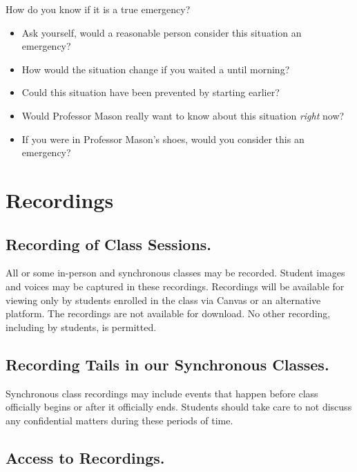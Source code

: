 \documentclass[
]{book}
\providecommand{\tightlist}{%
  \setlength{\itemsep}{0pt}\setlength{\parskip}{0pt}}
\begin{document}
How do you know if it is a true emergency?

\begin{itemize}
\tightlist
\item
  Ask yourself, would a reasonable person consider this situation an emergency?
\item
  How would the situation change if you waited a until morning?
\item
  Could this situation have been prevented by starting earlier?
\item
  Would Professor Mason really want to know about this situation \emph{right} now?
\item
  If you were in Professor Mason's shoes, would you consider this an emergency?
\end{itemize}

\hypertarget{recordings}{%
\section{Recordings}\label{recordings}}

\hypertarget{recording-of-class-sessions.}{%
\subsection{Recording of Class Sessions.}\label{recording-of-class-sessions.}}

All or some in-person and synchronous classes may be recorded. Student images and voices may be captured in these recordings. Recordings will be available for viewing only by students enrolled in the class via Canvas or an alternative platform. The recordings are not available for download. No other recording, including by students, is permitted.

\hypertarget{recording-tails-in-our-synchronous-classes.}{%
\subsection{Recording Tails in our Synchronous Classes.}\label{recording-tails-in-our-synchronous-classes.}}

Synchronous class recordings may include events that happen before class officially begins or after it officially ends. Students should take care to not discuss any confidential matters during these periods of time.

\hypertarget{access-to-recordings.}{%
\subsection{Access to Recordings.}\label{access-to-recordings.}}
\end{document}
